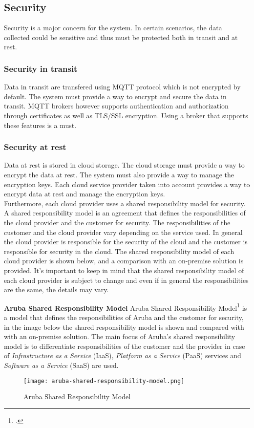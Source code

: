 \subsection{Security}
Security is a major concern for the system. In certain scenarios, the data collected could be sensitive and thus must be protected both in transit and at rest.
    \subsubsection{Security in transit}
    Data in transit are transfered using MQTT protocol which is not encrypted by default. The system must provide a way to encrypt and secure the data in transit. MQTT brokers however supports authentication and authorization through certificates as well as TLS/SSL encryption. Using a broker that supports these features is a must.
    
    \subsubsection{Security at rest}
    Data at rest is stored in cloud storage. The cloud storage must provide a way to encrypt the data at rest. The system must also provide a way to manage the encryption keys. Each cloud service provider taken into account provides a way to encrypt data at rest and manage the encryption keys.\\ 
    Furthermore, each cloud provider uses a shared responsibility model for security. A shared responsibility model is an agreement that defines the responsibilities of the cloud provider and the customer for security. The responsibilities of the customer and the cloud provider vary depending on the service used. In general the cloud provider is responsible for the security of the cloud and the customer is responsible for security in the cloud.
    The shared responsibility model of each cloud provider is shown below, and a comparison with an on-premise solution is provided. It's important to keep in mind that the shared responsibility model of each cloud provider is subject to change and even if in general the responsibilities are the same, the details may vary.
    
    \newpage
    \textbf{Aruba Shared Responsibility Model}
    \href{https://kb.arubacloud.com/en/computing/use-and-technology/shared-responsibility-model.aspx}{Aruba Shared Responsibility Model}\footcite{site:aruba-shared-responsibility-model} is a model that defines the responsibilities of Aruba and the customer for security, in the image below the shared responsibility model is shown and compared with with an on-premise solution. The main focus of Aruba's shared responsibility model is to differentiate responsibilities of the customer and the provider in case of \textit{Infrastructure as a Service} (IaaS), \textit{Platform as a Service} (PaaS) services and \textit{Software as a Service} (SaaS) are used.\\
    \begin{figure}[htbp]
        \centering
        \texttt{[image: aruba-shared-responsibility-model.png]}
        \caption{Aruba Shared Responsibility Model}
    \end{figure}

